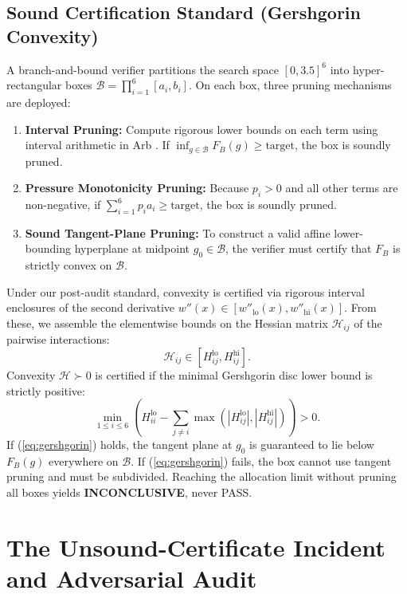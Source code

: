 \documentclass[11pt,a4paper]{article}
\theoremstyle{remark}
\begin{document}
\subsection{Sound Certification Standard (Gershgorin Convexity)}
A branch-and-bound verifier partitions the search space $[0, 3.5]^6$ into hyper-rectangular boxes $\mathcal{B} = \prod_{i=1}^6 [a_i, b_i]$. On each box, three pruning mechanisms are deployed:
\begin{enumerate}
\item \textbf{Interval Pruning:} Compute rigorous lower bounds on each term using interval arithmetic in Arb \cite{johansson2017arb}. If $\inf_{g \in \mathcal{B}} F_B(g) \ge \text{target}$, the box is soundly pruned.
\item \textbf{Pressure Monotonicity Pruning:} Because $p_i > 0$ and all other terms are non-negative, if $\sum_{i=1}^6 p_i a_i \ge \text{target}$, the box is soundly pruned.
\item \textbf{Sound Tangent-Plane Pruning:} To construct a valid affine lower-bounding hyperplane at midpoint $g_0 \in \mathcal{B}$, the verifier must certify that $F_B$ is strictly convex on $\mathcal{B}$.
\end{enumerate}
Under our post-audit standard, convexity is certified via rigorous interval enclosures of the second derivative $w''(x) \in [w''_{\text{lo}}(x), w''_{\text{hi}}(x)]$. From these, we assemble the elementwise bounds on the Hessian matrix $\mathcal{H}_{ij}$ of the pairwise interactions:
\[
 \mathcal{H}_{ij} \in [H_{ij}^{\text{lo}}, H_{ij}^{\text{hi}}].
\]
Convexity $\mathcal{H} \succ 0$ is certified if the minimal Gershgorin disc lower bound is strictly positive:
\begin{equation}
 \min_{1 \le i \le 6} \left( H_{ii}^{\text{lo}} - \sum_{j \ne i} \max\left(|H_{ij}^{\text{lo}}|, |H_{ij}^{\text{hi}}|\right) \right) > 0.
 \label{eq:gershgorin}
\end{equation}
If (\ref{eq:gershgorin}) holds, the tangent plane at $g_0$ is guaranteed to lie below $F_B(g)$ everywhere on $\mathcal{B}$. If (\ref{eq:gershgorin}) fails, the box cannot use tangent pruning and must be subdivided. Reaching the allocation limit without pruning all boxes yields \textbf{INCONCLUSIVE}, never PASS.

\section{The Unsound-Certificate Incident and Adversarial Audit}
\end{document}
